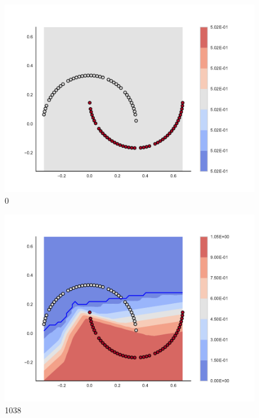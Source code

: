 \begin{subfigure}[b]{0.09\textwidth}
    \includegraphics[width=\textwidth]{img/convergence/0.pdf}
    \caption{0}
    \label{fig:convergence_0}
\end{subfigure}
%
\begin{subfigure}[b]{0.09\textwidth}
    \includegraphics[width=\textwidth]{img/convergence/1038.pdf}
    \caption{1038}
    \label{fig:convergence_1038}
\end{subfigure}
%
